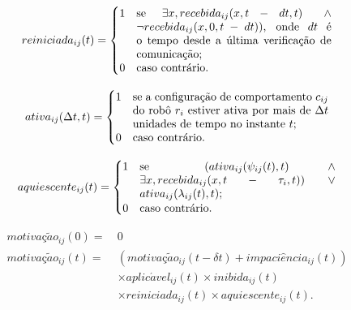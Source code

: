 \begin{equation}
    reiniciada_{ij}(t) =
    \begin{cases}
        1 & \parbox[t]{.5\textwidth}{se $\exists x, recebida_{ij}(x, t - dt, t) \: \land \: \lnot recebida_{ij}(x, 0, t - dt))$, onde $dt$ é o tempo desde a última verificação de comunicação;} \\
        0 & \text{caso contrário.}
    \end{cases}
\end{equation}

\begin{equation}
    ativa_{ij}(\Delta t, t) =
    \begin{cases}
        1 & \parbox[t]{.5\textwidth}{se a configuração de comportamento $c_{ij}$ do robô $r_i$ estiver ativa por mais de $\Delta t$ unidades de tempo no instante $t$;} \\
        0 & \text{caso contrário.}
    \end{cases}
\end{equation}

\begin{equation}
    aquiescente_{ij}(t) =
    \begin{cases}
        1 & \parbox[t]{.5\textwidth}{se $(ativa_{ij}(\psi_{ij}(t), t) \, 
        \land \, \exists x, recebida_{ij}(x, t - \tau_i, t)) \, \lor \, ativa_{ij}(\lambda_{ij}(t), t)$;} \\
        0 & \text{caso contrário.}
    \end{cases}
\end{equation}

\begin{equation}
    \begin{aligned}
        motiva\textit{ç}\tilde{a}o_{ij}(0) = \ & 0 \\
        motiva\textit{ç}\tilde{a}o_{ij}(t) = \ & (motiva\textit{ç}\tilde{a}o_{ij}(t - \delta t) + impaci\hat{e}ncia_{ij}(t)) \\
        & \times aplic\acute{a}vel_{ij}(t) \times inibida_{ij}(t) \\
        & \times reiniciada_{ij}(t) \times aquiescente_{ij}(t).
    \end{aligned}
\end{equation}

